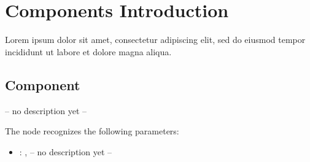 \section{Components Introduction}Lorem ipsum dolor sit amet, consectetur adipiscing elit, sed do eiusmod tempor incididunt ut labore et dolore magna aliqua.



\subsection{Component}
  -- no description yet --

  The  node recognizes the following parameters:
    \begin{itemize}
      \item {}: , 
        -- no description yet --
  \end{itemize}

